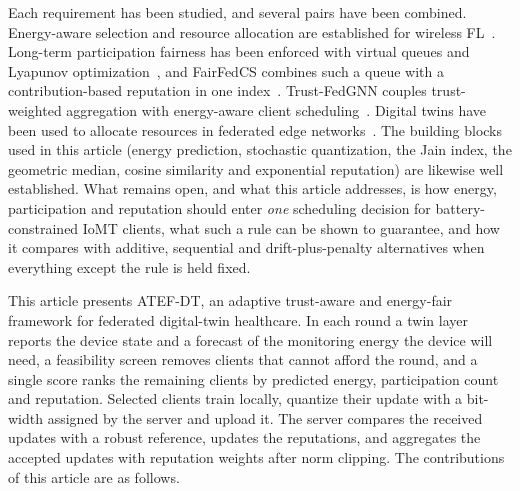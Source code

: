 \begin{revblock}Each requirement has been studied, and several pairs have been combined. Energy-aware selection and resource allocation are established for wireless FL~\cite{nishio2019client,tran2019federated,yang2021energy}. Long-term participation fairness has been enforced with virtual queues and Lyapunov optimization~\cite{huang2021efficiency}, and FairFedCS combines such a queue with a contribution-based reputation in one index~\cite{shi2023fairfedcs}. Trust-FedGNN couples trust-weighted aggregation with energy-aware client scheduling~\cite{reis2026trustfedgnn}. Digital twins have been used to allocate resources in federated edge networks~\cite{lu2021communication,zhou2025energy}. The building blocks used in this article (energy prediction, stochastic quantization, the Jain index, the geometric median, cosine similarity and exponential reputation) are likewise well established. What remains open, and what this article addresses, is how energy, participation and reputation should enter \emph{one} scheduling decision for battery-constrained IoMT clients, what such a rule can be shown to guarantee, and how it compares with additive, sequential and drift-plus-penalty alternatives when everything except the rule is held fixed.\end{revblock}

This article presents ATEF-DT, an adaptive trust-aware and energy-fair framework for federated digital-twin healthcare. In each round a twin layer reports the device state and a forecast of the monitoring energy the device will need, a feasibility screen removes clients that cannot afford the round, and a single score ranks the remaining clients by predicted energy, participation count and reputation. Selected clients train locally, quantize their update with a bit-width assigned by the server and upload it. The server compares the received updates with a robust reference, updates the reputations, and aggregates the accepted updates with reputation weights after norm clipping. The contributions of this article are as follows.

